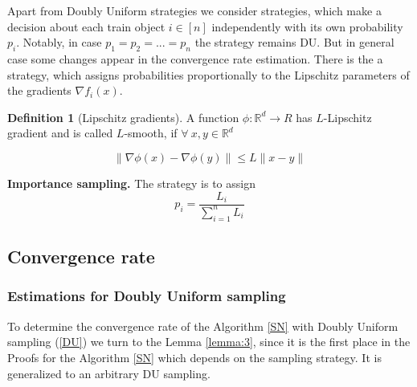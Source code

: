 \documentclass{article}
\theoremstyle{definition}
\newtheorem{definition}{Definition}
\theoremstyle{assumption}
\theoremstyle{lemma}
\theoremstyle{theorem}
\theoremstyle{proposition}
\begin{document}
	Apart from Doubly Uniform strategies we consider strategies, which make a decision about each train object $i \in [n]$ independently with its own probability $p_i$. Notably, in case $p_1 = p_2 =...= p_n$ the strategy remains DU. But in general case some changes appear in the convergence rate estimation. There is the a strategy, which assigns probabilities proportionally to the Lipschitz parameters of the gradients $\nabla f_i(x)$.
	
	\begin{definition} [Lipschitz gradients]\label{Lip}
		A function $\phi: \mathbb R^d \rightarrow R$ has $L$-Lipschitz gradient and is called $L$-smooth, if $\forall\ x, y \in \mathbb R^d$
		
		\begin{equation}\label{lip-hess}
			\| \nabla \phi(x) - \nabla \phi(y) \| \leqslant L \| x - y \|
		\end{equation}
	\end{definition}

	\textbf{Importance sampling.} The strategy is to assign
	\begin{equation}
		p_i = \frac{L_i}{\sum \limits_{i=1}^n L_i}
	\end{equation}

	\subsection {Convergence rate}
	
	\subsubsection{Estimations for Doubly Uniform sampling}
	
	To determine the convergence rate of the Algorithm \ref{SN} with Doubly Uniform sampling (\ref{DU}) we turn to the Lemma \ref{lemma:3}, since it is the first place in the Proofs for the Algorithm \ref{SN} which depends on the sampling strategy. It is generalized to an arbitrary DU sampling.
	
\end{document}
